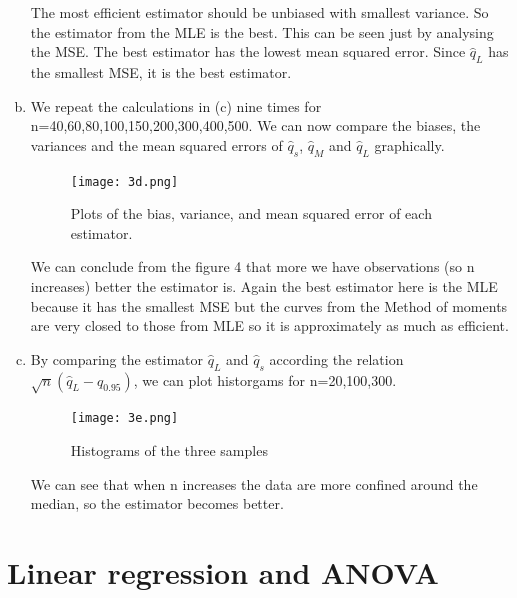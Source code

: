 \documentclass[a4paper]{article}
\begin{document}
\begin{enumerate}[(a)]
The most efficient estimator should be unbiased with smallest variance. So the estimator from the MLE is the best. This can be seen just by analysing the MSE. The best estimator has the lowest mean squared error. Since $\hat{q}_L$ has the smallest MSE, it is the best estimator.
\\

\item We repeat the calculations in (c) nine times for n=40,60,80,100,150,200,300,400,500. We can now compare the biases, the variances and the mean squared errors of $\hat{q}_s$, $\hat{q}_M$ and $\hat{q}_L$ graphically. 

\begin{figure}[!h]
    \centering
  \texttt{[image: 3d.png]}
  \caption{Plots of the bias, variance, and mean squared error of each estimator.}
\end{figure}

We can conclude from the figure 4 that more we have observations (so n increases) better the estimator is. Again the best estimator here is the MLE because it has the smallest MSE but the curves from the Method of moments are very closed to those from MLE so it is approximately as much as efficient.


\item By comparing the estimator $\hat{q}_L$ and $\hat{q}_s$ according the relation $\sqrt{n}(\hat{q}_L-q_{0.95})$, we can plot historgams for n=20,100,300.

\begin{figure}[!h]
    \centering
  \texttt{[image: 3e.png]}
  \caption{Histograms of the three samples}
\end{figure}

We can see that when n increases the data are more confined around the median, so the estimator becomes better.


\end{enumerate}




\newpage

\section{Linear regression and ANOVA}
\end{document}
